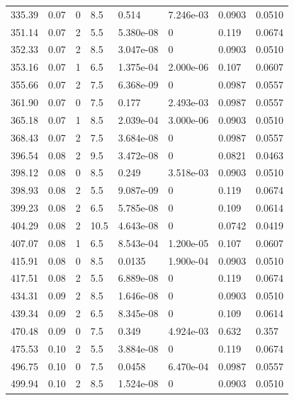 \documentclass[preview]{standalone}
\begin{document}
{{{\begin{tabular}{L{1.2cm}C{1.2cm} C{0.3cm}C{0.5cm} C{1.4cm}C{1.4cm} C{1.4cm}C{1.4cm}}
  335.39  &  0.07  & 0     & 8.5 &  0.514  & 7.246e-03  & 0.0903 &  0.0510   \\ 
  351.14  &  0.07  & 2     & 5.5 &  5.380e-08  & 0  & 0.119 &  0.0674   \\ 
  352.33  &  0.07  & 2     & 8.5 &  3.047e-08  & 0  & 0.0903 &  0.0510   \\ 
  353.16  &  0.07  & 1     & 6.5 &  1.375e-04  & 2.000e-06  & 0.107 &  0.0607   \\ 
  355.66  &  0.07  & 2     & 7.5 &  6.368e-09  & 0  & 0.0987 &  0.0557   \\ 
  361.90  &  0.07  & 0     & 7.5 &  0.177  & 2.493e-03  & 0.0987 &  0.0557   \\ 
  365.18  &  0.07  & 1     & 8.5 &  2.039e-04  & 3.000e-06  & 0.0903 &  0.0510   \\ 
  368.43  &  0.07  & 2     & 7.5 &  3.684e-08  & 0  & 0.0987 &  0.0557   \\ 
  396.54  &  0.08  & 2     & 9.5 &  3.472e-08  & 0  & 0.0821 &  0.0463   \\ 
  398.12  &  0.08  & 0     & 8.5 &  0.249  & 3.518e-03  & 0.0903 &  0.0510   \\ 
  398.93  &  0.08  & 2     & 5.5 &  9.087e-09  & 0  & 0.119 &  0.0674   \\ 
  399.23  &  0.08  & 2     & 6.5 &  5.785e-08  & 0  & 0.109 &  0.0614   \\ 
  404.29  &  0.08  & 2     & 10.5 &  4.643e-08  & 0  & 0.0742 &  0.0419   \\ 
  407.07  &  0.08  & 1     & 6.5 &  8.543e-04  & 1.200e-05  & 0.107 &  0.0607   \\ 
  415.91  &  0.08  & 0     & 8.5 &  0.0135  & 1.900e-04  & 0.0903 &  0.0510   \\ 
  417.51  &  0.08  & 2     & 5.5 &  6.889e-08  & 0  & 0.119 &  0.0674   \\ 
  434.31  &  0.09  & 2     & 8.5 &  1.646e-08  & 0  & 0.0903 &  0.0510   \\ 
  439.34  &  0.09  & 2     & 6.5 &  8.345e-08  & 0  & 0.109 &  0.0614   \\ 
  470.48  &  0.09  & 0     & 7.5 &  0.349  & 4.924e-03  & 0.632 &  0.357   \\ 
  475.53  &  0.10  & 2     & 5.5 &  3.884e-08  & 0  & 0.119 &  0.0674   \\ 
  496.75  &  0.10  & 0     & 7.5 &  0.0458  & 6.470e-04  & 0.0987 &  0.0557   \\ 
  499.94  &  0.10  & 2     & 8.5 &  1.524e-08  & 0  & 0.0903 &  0.0510   \\ 

\end{tabular}}}}
\end{document}

